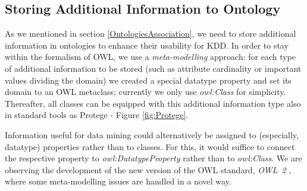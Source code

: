 \subsection{Storing Additional Information to Ontology}

As we mentioned in section \ref{OntologiesAssociation}, we need to store additional information in ontologies to enhance their usability for KDD. %
In order to stay within the formalism of OWL, we use a \emph{meta-modelling} approach:
for each type of additional information to be stored (such as attribute cardinality or important values dividing the domain) we created a special datatype property and set its domain to an OWL metaclass; currently we only use \emph{owl:Class} for simplicity. 
Thereafter, all classes can be equipped with this additional information type also in standard tools as Protege - Figure \ref{fig:Protege}. 

Information useful for data mining could alternatively be assigned to (especially, datatype) properties rather than to classes.
For this, it would suffice to connect the respective property to \emph{owl:DatatypeProperty} rather than to \emph{owl:Class}.
We are observing the development of the new version of the OWL standard, \emph{OWL~2} \cite{OWL2}, where some meta-modelling issues are handled in a novel way.

